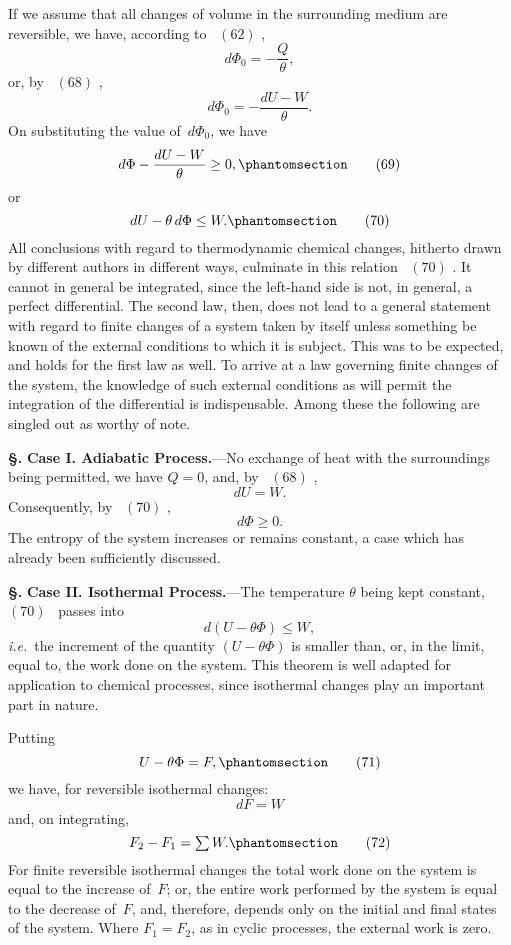 \documentclass[12pt]{book}[2005/09/16]
\newcommand{\Chg}[2]{#2}
\newcommand{\Add}[1]{\Chg{}{#1}}
\newcommand{\Section}[1]{
  \medskip\par\textbf{§\;#1}
  \label{section:#1}
}
\newcommand{\Tag}[1]{%
  \phantomsection\label{eqn:#1}\tag*{\ensuremath{#1}}%
}
\newcommand{\Eq}[1]{%
  \hyperref[eqn:#1]{\ensuremath{#1}}%
}
\newcommand{\PageSep}[1]{\ignorespaces}
\newcommand{\Topic}[1]{\textbf{#1}}
\newcommand{\ie}{\emph{i.e.}}
\newcommand{\tsum}{\mathop{\textstyle\sum}\limits}
\begin{document}
If we assume that all changes of volume in the surrounding
medium are reversible, we have, according to~\Eq{(62)},
\[
d\Phi_{0} = -\frac{Q}{\theta},
\]
or, by~\Eq{(68)},
\[
d\Phi_{0} = -\frac{dU - W}{\theta}.
\]
On substituting the value of~$d\Phi_{0}$, we have
\[
d\Phi - \frac{dU - W}{\theta} \geq 0\Add{,}
\Tag{(69)}
\]
or
\[
dU - \theta\, d\Phi \leq W\Add{.}
\Tag{(70)}
\]
All conclusions with regard to thermodynamic chemical
changes, hitherto drawn by different authors in different
ways, culminate in this relation~\Eq{(70)}. It cannot in general
be integrated, since the left-hand side is not, in general,
a perfect differential. The second law, then, does not lead
to a general statement with regard to finite changes of a
system taken by itself unless something be known of the
external conditions to which it is subject. This was to be
expected, and holds for the first law as well. To arrive at a
law governing finite changes of the system, the knowledge
of such external conditions as will permit the integration of
the differential is indispensable. Among these the following
are singled out as worthy of note.

\Section{141.} \Topic{Case I\@. Adiabatic Process.}---No exchange of
%
%
heat with the surroundings being permitted, we have $Q = 0$,
and, by~\Eq{(68)},
\[
dU = W.
\]
Consequently, by~\Eq{(70)},
\[
d\Phi \geq 0.
\]
The entropy of the system increases or remains constant, a
case which has already been sufficiently discussed.
\PageSep{110}

\Section{142.} \Topic{Case II\@. Isothermal Process.}---The temperature
%
$\theta$ being kept constant, \Eq{(70)}~passes into
\[
d(U - \theta\Phi) \leq W\Add{,}
\]
\ie\ the increment of the quantity $(U - \theta\Phi)$ is smaller than,
or, in the limit, equal to, the work done on the system.
This theorem is well adapted for application to chemical
processes, since isothermal changes play an important part
in nature.

Putting
\[
U - \theta\Phi = F,
\Tag{(71)}
\]
we have, for reversible isothermal changes:
\[
dF = W
\]
and, on integrating,
\[
F_{2} - F_{1} = \tsum W\Add{.}
\Tag{(72)}
\]
For finite reversible isothermal changes the total work
done on the system is equal to the increase of~$F$; or, the
entire work performed by the system is equal to the decrease
of~$F$, and, therefore, depends only on the initial and final
states of the system. Where $F_{1} = F_{2}$, as in cyclic processes,
the external work is zero.
\end{document}
